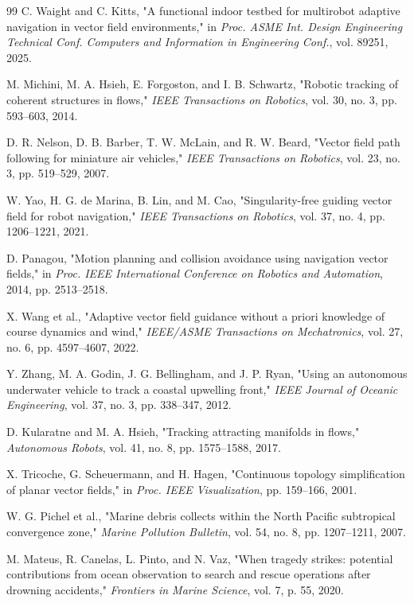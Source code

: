 \documentclass[lettersize,journal]{IEEEtran}
\begin{document}
\begin{thebibliography}{99}
 C. Waight and C. Kitts, "A functional indoor testbed for multirobot adaptive navigation in vector field environments," in \textit{Proc. ASME Int. Design Engineering Technical Conf. Computers and Information in Engineering Conf.}, vol. 89251, 2025.

 M. Michini, M. A. Hsieh, E. Forgoston, and I. B. Schwartz, "Robotic tracking of coherent structures in flows," \textit{IEEE Transactions on Robotics}, vol. 30, no. 3, pp. 593--603, 2014.

 D. R. Nelson, D. B. Barber, T. W. McLain, and R. W. Beard, "Vector field path following for miniature air vehicles," \textit{IEEE Transactions on Robotics}, vol. 23, no. 3, pp. 519--529, 2007.

 W. Yao, H. G. de Marina, B. Lin, and M. Cao, "Singularity-free guiding vector field for robot navigation," \textit{IEEE Transactions on Robotics}, vol. 37, no. 4, pp. 1206--1221, 2021.

 D. Panagou, "Motion planning and collision avoidance using navigation vector fields," in \textit{Proc. IEEE International Conference on Robotics and Automation}, 2014, pp. 2513--2518.

 X. Wang et al., "Adaptive vector field guidance without a priori knowledge of course dynamics and wind," \textit{IEEE/ASME Transactions on Mechatronics}, vol. 27, no. 6, pp. 4597--4607, 2022.

 Y. Zhang, M. A. Godin, J. G. Bellingham, and J. P. Ryan, "Using an autonomous underwater vehicle to track a coastal upwelling front," \textit{IEEE Journal of Oceanic Engineering}, vol. 37, no. 3, pp. 338--347, 2012.

 D. Kularatne and M. A. Hsieh, "Tracking attracting manifolds in flows," \textit{Autonomous Robots}, vol. 41, no. 8, pp. 1575--1588, 2017.

 X. Tricoche, G. Scheuermann, and H. Hagen, "Continuous topology simplification of planar vector fields," in \textit{Proc. IEEE Visualization}, pp. 159--166, 2001.

 W. G. Pichel et al., "Marine debris collects within the North Pacific subtropical convergence zone," \textit{Marine Pollution Bulletin}, vol. 54, no. 8, pp. 1207--1211, 2007.

 M. Mateus, R. Canelas, L. Pinto, and N. Vaz, "When tragedy strikes: potential contributions from ocean observation to search and rescue operations after drowning accidents," \textit{Frontiers in Marine Science}, vol. 7, p. 55, 2020.


\end{thebibliography}
\end{document}
